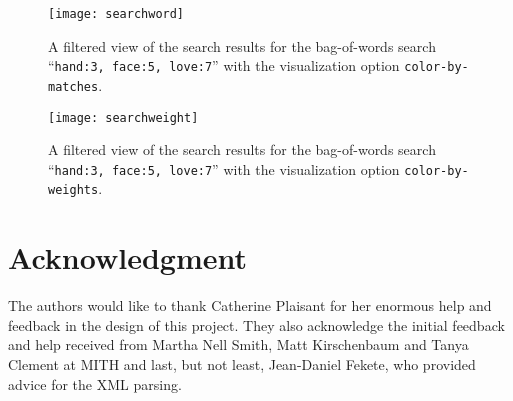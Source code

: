 \documentclass[10pt, twocolumn]{article}
\begin{document}
\begin{figure*}
\begin{center}
\texttt{[image: searchword]} 
\caption{A filtered view of the search results for the bag-of-words search ``\texttt{hand:3, face:5, love:7}'' with the visualization option \texttt{color-by-matches}.} \label{fig:searchword}
\end{center}
\end{figure*}

\begin{figure*}
\begin{center}
\texttt{[image: searchweight]} 
\end{center}
\caption{A filtered view of the search results for the bag-of-words search ``\texttt{hand:3, face:5, love:7}'' with the visualization option \texttt{color-by-weights}.} \label{fig:searchweight}
\end{figure*}

\section{Acknowledgment}
The authors would like to thank Catherine Plaisant for her enormous help and feedback in the design of this project. They also acknowledge the initial feedback and help received from Martha Nell Smith, Matt Kirschenbaum and Tanya Clement at MITH and last, but not least, Jean-Daniel Fekete, who provided advice for the XML parsing. 
\end{document}
